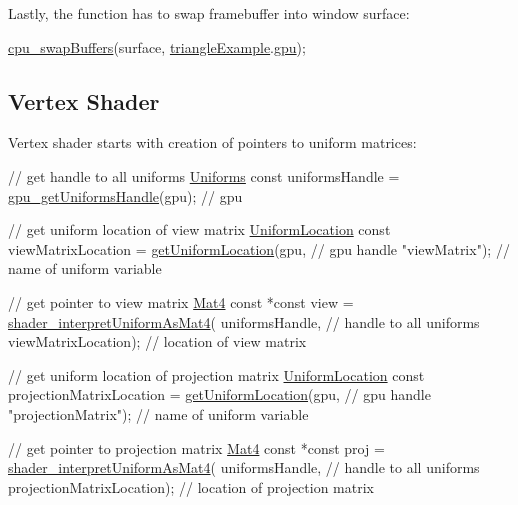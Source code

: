 Lastly, the function has to swap framebuffer into window surface\-: 
\begin{DoxyCodeInclude}
  \hyperlink{swapBuffers_8c_aa71ffc00c4f3d7e232828f8b7c47eb9b}{cpu\_swapBuffers}(surface, \hyperlink{triangleExample_8c_a235d77635ad30ec86f81d2caabbdc1b5}{triangleExample}.\hyperlink{structTriangleExampleVariables_a6c5c3f82065ae9aac07f9e6f11dd03b3}{gpu});
\end{DoxyCodeInclude}
\hypertarget{triangleExample.c_VertexShader}{}\subsection{Vertex Shader}\label{triangleExample.c_VertexShader}
Vertex shader starts with creation of pointers to uniform matrices\-: 
\begin{DoxyCodeInclude}
  \textcolor{comment}{// get handle to all uniforms}
  \hyperlink{fwd_8h_a4e6b8a8d832d478e8d761c0a52163a7c}{Uniforms} \textcolor{keyword}{const} uniformsHandle = \hyperlink{gpu_8h_a72dddc46dcba2d4e515fc23b61f0819a}{gpu\_getUniformsHandle}(gpu);  \textcolor{comment}{// gpu}

  \textcolor{comment}{// get uniform location of view matrix}
  \hyperlink{uniforms_8h_a0827d09b4e6a18f2718775e7e9289fbd}{UniformLocation} \textcolor{keyword}{const} viewMatrixLocation =
      \hyperlink{uniforms_8h_a6ea94982618b1c339a97a528b0670a53}{getUniformLocation}(gpu,            \textcolor{comment}{// gpu handle}
                         \textcolor{stringliteral}{"viewMatrix"});  \textcolor{comment}{// name of uniform variable}

  \textcolor{comment}{// get pointer to view matrix}
  \hyperlink{structMat4}{Mat4} \textcolor{keyword}{const} *\textcolor{keyword}{const} view = \hyperlink{uniforms_8h_a83cb2c94ffb0623e9bb8d9508885376a}{shader\_interpretUniformAsMat4}(
      uniformsHandle,       \textcolor{comment}{// handle to all uniforms}
      viewMatrixLocation);  \textcolor{comment}{// location of view matrix}

  \textcolor{comment}{// get uniform location of projection matrix}
  \hyperlink{uniforms_8h_a0827d09b4e6a18f2718775e7e9289fbd}{UniformLocation} \textcolor{keyword}{const} projectionMatrixLocation =
      \hyperlink{uniforms_8h_a6ea94982618b1c339a97a528b0670a53}{getUniformLocation}(gpu,                  \textcolor{comment}{// gpu handle}
                         \textcolor{stringliteral}{"projectionMatrix"});  \textcolor{comment}{// name of uniform variable}

  \textcolor{comment}{// get pointer to projection matrix}
  \hyperlink{structMat4}{Mat4} \textcolor{keyword}{const} *\textcolor{keyword}{const} proj = \hyperlink{uniforms_8h_a83cb2c94ffb0623e9bb8d9508885376a}{shader\_interpretUniformAsMat4}(
      uniformsHandle,             \textcolor{comment}{// handle to all uniforms}
      projectionMatrixLocation);  \textcolor{comment}{// location of projection matrix}
\end{DoxyCodeInclude}
